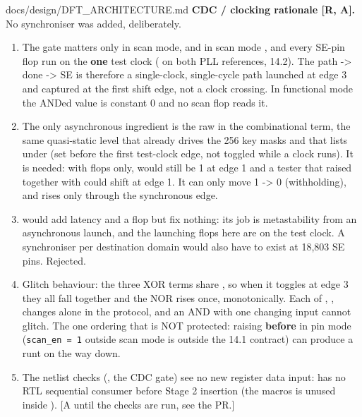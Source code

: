 \begin{relocated}{docs/design/DFT_ARCHITECTURE.md}
\textbf{CDC / clocking rationale {[}R, A{]}.} No synchroniser was added,
deliberately.

\begin{enumerate}
\def\labelenumi{\arabic{enumi}.}
\tightlist
\item
  The gate matters only in scan mode, and in scan mode ,
   and every SE-pin flop run on the \textbf{one} test
  clock ( on both PLL references, 14.2). The path
   -\textgreater{} done -\textgreater{} SE is
  therefore a single-clock, single-cycle path launched at edge 3 and
  captured at the first shift edge, not a clock crossing. In functional
  mode the ANDed value is constant 0 and no scan flop reads it.
\item
  The only asynchronous ingredient is the raw  in the
  combinational term, the same quasi-static level that already drives
  the 256 key masks and that  lists under
   (set before the first test-clock edge, not
  toggled while a clock runs). It is needed: with flops only,
   would still be 1 at edge 1 and a tester that raised
   together with  could shift at edge 1.
  It can only move  1 -\textgreater{} 0 (withholding), and
   rises only through the synchronous 
  edge.
\item
   would add latency and a flop but fix nothing: its job
  is metastability from an asynchronous launch, and the launching flops
  here are on the test clock. A synchroniser per destination domain
  would also have to exist at 18,803 SE pins. Rejected.
\item
  Glitch behaviour: the three XOR terms share , so
  when it toggles at edge 3 they all fall together and the NOR rises
  once, monotonically. Each of , ,
   changes alone in the protocol, and an AND with one
  changing input cannot glitch. The one ordering that is NOT protected:
  raising  \textbf{before}  in pin mode
  (\texttt{scan\_\allowbreak{}en\ =\allowbreak{}\ 1} outside scan mode
  is outside the 14.1 contract) can produce a runt on the way down.
\item
  The netlist checks (, the CDC gate) see no new
  register data input:  has no RTL sequential consumer
  before Stage 2 insertion (the macro\textquotesingle s 
  is unused inside ). {[}A until the checks are run,
  see the PR.{]}
\end{enumerate}


\end{relocated}
